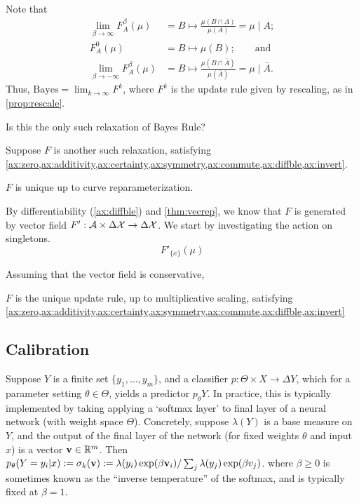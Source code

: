\documentclass{article}
\begin{document}
Note that
\begin{align*}
\lim_{\beta\to\infty} F^\beta_A(\mu) &= B \mapsto \frac{\mu(B \cap A)}{\mu(A)}
   = \mu \mid A; \\
 F^0_A(\mu) &= B \mapsto \mu(B); \qquad\text{and}\\
\lim_{\beta\to-\infty} F^\beta_A(\mu) &= B \mapsto \frac{\mu(B \cap \bar A)}{\mu(\bar A)}
	  = \mu \mid \bar A.
\end{align*}
Thus, $\mathrm{Bayes} = \lim_{k \to \infty} F^{k}$, where $F^k$ is the update rule given by rescaling, as in \cref{prop:rescale}.



\begin{wip}
Is this the only such relaxation of Bayes Rule?

Suppose $F$ is another such relaxation, satisfying \cref{ax:zero,ax:additivity,ax:certainty,ax:symmetry,ax:commute,ax:diffble,ax:invert}.

\begin{prop}
	$F$ is unique up to curve reparameterization.
\end{prop}

By differentiability (\cref{ax:diffble}) and \cref{thm:vecrep}, we know that $F$ is generated by vector field $F' : \mathcal A \times \Delta\mathcal X \to \Delta\mathcal X$.
We start by investigating the action on singletons.
\[
	F'_{\{x\}}(\mu)
\]

Assuming that the vector field is conservative,

\begin{conj}
	$F$ is the unique update rule, up to multiplicative scaling, satisfying
	\cref{ax:zero,ax:additivity,ax:certainty,ax:symmetry,ax:commute,ax:diffble,ax:invert}
\end{conj}
\end{wip}




\subsection{Calibration}

Suppose $Y$ is a finite set $\{y_1, \ldots, y_m\}$, and
a classifier $p : \Theta \times X \to \Delta Y$, which for a parameter setting $\theta \in \Theta$, yields a predictor $p_\theta Y$. 
In practice, this is typically implemented by taking applying a `softmax layer' to final layer of a neural network (with weight space $\Theta$). 
Concretely, suppose $\lambda(Y)$ is a base measure on $Y$, and the output of the final layer of the network (for fixed weights $\theta$ and input $x$) is a vector $\mathbf{v}\in \mathbb R^{m}$. 
Then $p_\theta(Y=y_i|x) := \sigma_k(\mathbf{v}) := \lambda(y_i) \exp(\beta \mathbf{v}_i) / \sum_j \lambda(y_j) \exp(\beta v_j)$. 
where $\beta \ge 0$ is sometimes known as the ``inverse temperature'' of the softmax, and is typically fixed at $\beta=1$. 
\end{document}
